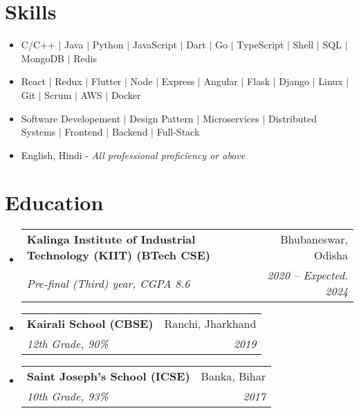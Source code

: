 \documentclass[letterpaper,11pt]{article}
\makeatletter
\newcommand{\resumeItem}[1]{
  \item\small{
    {#1 \vspace{-2pt}}
  }
}
\newcommand{\resumeSubheading}[4]{
  \vspace{-2pt}\item
    \begin{tabular*}{0.97\textwidth}[t]{l@{\extracolsep{\fill}}r}
      \textbf{#1} & #2 \\
      \textit{\small#3} & \textit{\small #4} \\
    \end{tabular*}\vspace{-7pt}
}
\newcommand{\resumeSubHeadingListStart}{\begin{itemize}[leftmargin=0.15in, label={}]}
\newcommand{\resumeSubHeadingListEnd}{\end{itemize}}
\newcommand{\resumeItemListStart}{\begin{itemize}}
\newcommand{\resumeItemListEnd}{\end{itemize}\vspace{-5pt}}
\makeatother
\begin{document}
\section{Skills}
    \begin{itemize}[leftmargin=0.15in, label={}]
        \small{\item{
            \resumeItemListStart
                \resumeItem{ C/C++ $|$ Java $|$ Python $|$ JavaScript $|$ Dart $|$ Go $|$ TypeScript $|$ Shell $|$ SQL $|$ MongoDB $|$ Redis}
                \resumeItem{ React $|$ Redux $|$ Flutter $|$ Node $|$ Express $|$ Angular $|$ Flask $|$ Django $|$ Linux $|$ Git $|$ Scrum $|$ AWS $|$ Docker}
                \resumeItem{ Software Developement $|$ Design Pattern $|$ Microservices $|$ Distributed Systems $|$ Frontend $|$ Backend $|$ Full-Stack}
                \resumeItem{ English, Hindi - \textit{All professional proficiency or above}}
            \resumeItemListEnd
        }}
    \end{itemize}
 
\section{Education}
  \resumeSubHeadingListStart
    \resumeSubheading
      {Kalinga Institute of Industrial Technology (KIIT) (BTech CSE)} {Bhubaneswar, Odisha}
      {Pre-final (Third) year, CGPA 8.6}{2020 -- Expected. 2024}

    \resumeSubheading
      {Kairali School (CBSE)}{Ranchi, Jharkhand}
      {12th Grade, 90\%}{2019}

    \resumeSubheading
      {Saint Joseph's School (ICSE)}{Banka, Bihar}
      {10th Grade, 93\%}{2017}
  \resumeSubHeadingListEnd
\end{document}
